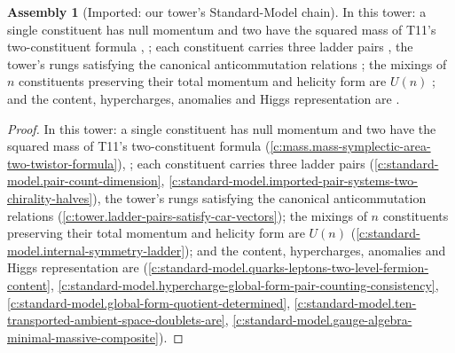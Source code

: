 \documentclass[11pt]{article}
\theoremstyle{definition}
\newtheorem{assembled}[theorem]{Assembly}
\theoremstyle{plain}
\begin{document}
\begin{assembled}[Imported: our tower's Standard-Model chain]\label{c:dark-tower-matter.imported-our-towers-chain}
In this tower: a single constituent has null momentum and two have the squared mass of T11's two-constituent formula \cite[Prop.~4.1]{ButlerT11}, \cite[Fact~2.1]{ButlerT12}; each constituent carries three ladder pairs \cite[Fact~2.2, Lem.~2.12]{ButlerT12}, the tower's rungs satisfying the canonical anticommutation relations \cite[Prop.~4.1]{ButlerT3}; the mixings of $n$ constituents preserving their total momentum and helicity form are $U(n)$ \cite[Prop.~3.1]{ButlerT12}; and the content, hypercharges, anomalies and Higgs representation are \cite[Thm.~4.1, Thm.~4.2, Prop.~5.3, Thm.~5.5, Prop.~9.22]{ButlerT12}.
\end{assembled}
\begin{proof}
In this tower: a single constituent has null momentum and two have the squared mass of T11's two-constituent formula \cite[Prop.~4.1]{ButlerT11} (\ref{c:mass.mass-symplectic-area-two-twistor-formula}), \cite[Fact~2.1]{ButlerT12}; each constituent carries three ladder pairs \cite[Fact~2.2, Lem.~2.12]{ButlerT12} (\ref{c:standard-model.pair-count-dimension}, \ref{c:standard-model.imported-pair-systems-two-chirality-halves}), the tower's rungs satisfying the canonical anticommutation relations \cite[Prop.~4.1]{ButlerT3} (\ref{c:tower.ladder-pairs-satisfy-car-vectors}); the mixings of $n$ constituents preserving their total momentum and helicity form are $U(n)$ \cite[Prop.~3.1]{ButlerT12} (\ref{c:standard-model.internal-symmetry-ladder}); and the content, hypercharges, anomalies and Higgs representation are \cite[Thm.~4.1, Thm.~4.2, Prop.~5.3, Thm.~5.5, Prop.~9.22]{ButlerT12} (\ref{c:standard-model.quarks-leptons-two-level-fermion-content}, \ref{c:standard-model.hypercharge-global-form-pair-counting-consistency}, \ref{c:standard-model.global-form-quotient-determined}, \ref{c:standard-model.ten-transported-ambient-space-doublets-are}, \ref{c:standard-model.gauge-algebra-minimal-massive-composite}).

\end{proof}
\end{document}
